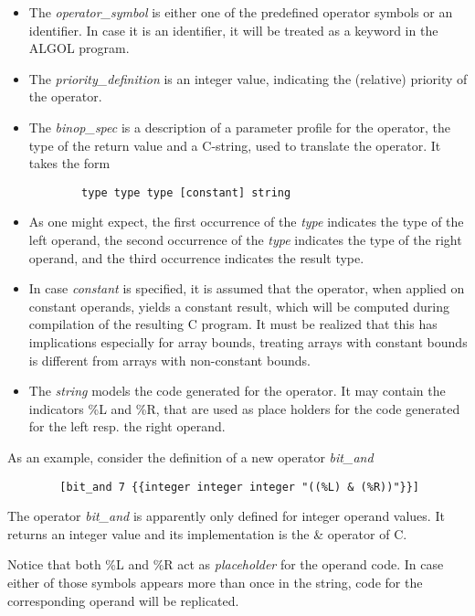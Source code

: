\documentclass[11pt]{article}
\begin{document}
\begin{itemize}
\item The {\em operator\_symbol} is either one of
the predefined operator symbols or an identifier.
In case it is an identifier, it will be treated as
a keyword in the ALGOL program.
\item
The {\em priority\_definition} is an integer value,
indicating the (relative) priority of the operator. 
\item
The {\em binop\_spec} is a description of a parameter profile for the
operator, the type of the return value and a C-string, used
to translate the operator. It takes the form
{\footnotesize
\begin{verbatim}
        type type type [constant] string
\end{verbatim}
}
\end{itemize}
\begin{itemize}
\item As one might expect, the first occurrence of the {\em type} indicates the
type of the left operand, the second occurrence of the {\em type}
indicates the type of the right operand, and the third occurrence
indicates the result type.
\item In case {\em constant} is specified, it is assumed that the operator, when
applied on constant operands, yields a constant result, which will
be computed during compilation of the resulting C program. It must be realized
that this has implications especially for array bounds, treating
arrays with constant bounds is different from arrays
with non-constant bounds.
\item The {\em string} models the code generated for the operator. It may contain
the indicators \%L and \%R, that are used as
place holders for the code generated for
the left resp. the right operand.  
\end{itemize}
As an example, consider the definition of a new operator {\em bit\_and}
{\footnotesize
\begin{verbatim}
        [bit_and 7 {{integer integer integer "((%L) & (%R))"}}]
\end{verbatim}
}
The operator {\em bit\_and} is apparently only defined
for integer operand values. It returns an integer value
and its implementation is the \& operator of C.

Notice that both \%L and \%R act as {\em placeholder} for the operand code.
In case either of those symbols appears more than once in the string,
code for the corresponding operand will be replicated.
\end{document}
